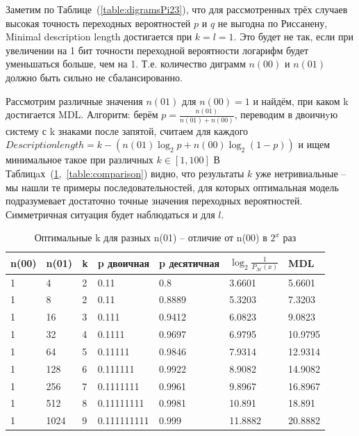 \documentclass[12pt]{article}
\begin{document}
	Заметим по Таблице~(\ref{table:digramsPi23}), что для рассмотренных трёх случаев высокая точность переходных вероятностей $p$ и $q$ не выгодна по Риссанену, Minimal description length достигается при $k=l=1$. Это будет не так, если при увеличении на 1 бит точности переходной вероятности логарифм будет уменьшаться больше, чем на 1. Т.е. количество диграмм $n(00)$ и $n(01)$ должно быть сильно не сбалансированно. %
	
	Рассмотрим различные значения $n(01)$ для $n(00)=1$ и найдём, при каком k достигается MDL. Алгоритм: берём $p = \frac{n(01)}{n(01)+n(00)}$, переводим в двоичнyю систему с k знаками после запятой, считаем для каждого $Description length = k - (n(01)\log_2{p}+n(00)\log_2{(1-p)})$ и ищем минимальное такое при различных $k\in[1,100]$ В Таблицaх~(\ref{table:n00n01},~\ref{table:comparison}) видно, что результаты $k$ уже нетривиальные -- мы нашли те примеры последовательностей, для которых оптимальная модель подразумевает достаточно точные значения переходных вероятностей. Симметричная ситуация будет наблюдаться и для $l$.
	
	\begin{table}[!h]
		\caption{Оптимальные k для разных n(01) -- отличие от n(00) в $2^x$ раз}
		\label{table:n00n01}
		\begin{center}
			\begin{tabular}{|l|l|l|l|l|l|l|}
				\hline
				n(00) & n(01) & k & p двоичная & p десятичная & $\log_2{\frac{1}{P_{\mathcal{M}}(x)}}$ & MDL \\
				\hline
				1 & 4 & 2 & 0.11 & 0.8 & 3.6601 & 5.6601 \\ 
				\hline 
				1 & 8 & 2 & 0.11 & 0.8889 & 5.3203 & 7.3203 \\ 
				\hline 
				1 & 16 & 3 & 0.111 & 0.9412 & 6.0823 & 9.0823 \\ 
				\hline 
				1 & 32 & 4 & 0.1111 & 0.9697 & 6.9795 & 10.9795 \\ 
				\hline 
				1 & 64 & 5 & 0.11111 & 0.9846 & 7.9314 & 12.9314 \\ 
				\hline 
				1 & 128 & 6 & 0.111111 & 0.9922 & 8.9082 & 14.9082 \\ 
				\hline 
				1 & 256 & 7 & 0.1111111 & 0.9961 & 9.8967 & 16.8967 \\ 
				\hline 
				1 & 512 & 8 & 0.11111111 & 0.9981 & 10.891 & 18.891 \\ 
				\hline 
				1 & 1024 & 9 & 0.111111111 & 0.999 & 11.8882 & 20.8882 \\ 
				\hline 
			\end{tabular}
		\end{center}
	\end{table}
	
\end{document}
